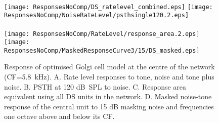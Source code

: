 \begin{figure}[htb]
{\hspace{0.5\textwidth}\hfill}\\
\texttt{[image: ResponsesNoComp/DS\_ratelevel\_combined.eps]}%
\texttt{[image: ResponsesNoComp/NoiseRateLevel/psthsingle120.2.eps]}\\ 
\hspace{0.5\textwidth}\hfill\\
\texttt{[image: ResponsesNoComp/RateLevel/response\_area.2.eps]}%
\texttt{[image: ResponsesNoComp/MaskedResponseCurve3/15/DS\_masked.eps]}\\
\caption[Optimised DS cell model responses]{Response of optimised Golgi cell model at the centre of the network (CF=5.8~kHz). 
A. Rate level responses to tone, noise and tone plus noise. 
B. PSTH at 120 dB~SPL to noise.  
C. Response area equivalent using all DS units in the network. 
D. Masked noise-tone response of the central unit to 15 dB masking noise and frequencies one octave above and below its CF.} 
\label{fig:DS_verification}
\end{figure}




